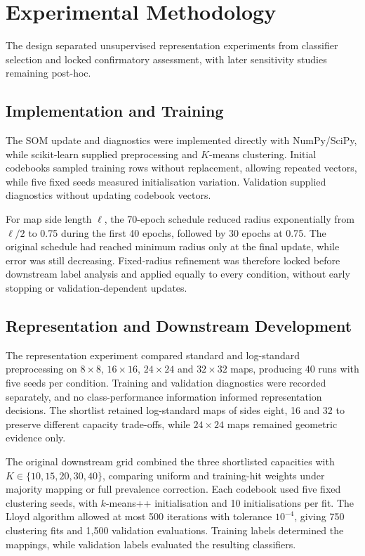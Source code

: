 \section{Experimental Methodology}

The design separated unsupervised representation experiments from classifier selection and locked confirmatory assessment, with later sensitivity studies remaining post-hoc.

\subsection{Implementation and Training}

The SOM update and diagnostics were implemented directly with NumPy/SciPy, while scikit-learn supplied preprocessing and $K$-means clustering. Initial codebooks sampled training rows without replacement, allowing repeated vectors, while five fixed seeds measured initialisation variation. Validation supplied diagnostics without updating codebook vectors.

For map side length $\ell$, the 70-epoch schedule reduced radius exponentially from $\ell/2$ to 0.75 during the first 40 epochs, followed by 30 epochs at 0.75. The original schedule had reached minimum radius only at the final update, while error was still decreasing. Fixed-radius refinement was therefore locked before downstream label analysis and applied equally to every condition, without early stopping or validation-dependent updates.

\subsection{Representation and Downstream Development}

The representation experiment compared standard and log-standard preprocessing on $8\times8$, $16\times16$, $24\times24$ and $32\times32$ maps, producing 40 runs with five seeds per condition. Training and validation diagnostics were recorded separately, and no class-performance information informed representation decisions. The shortlist retained log-standard maps of sides eight, 16 and 32 to preserve different capacity trade-offs, while $24\times24$ maps remained geometric evidence only.

The original downstream grid combined the three shortlisted capacities with $K\in\{10,15,20,30,40\}$, comparing uniform and training-hit weights under majority mapping or full prevalence correction. Each codebook used five fixed clustering seeds, with $k$-means++ initialisation and 10 initialisations per fit. The Lloyd algorithm allowed at most 500 iterations with tolerance $10^{-4}$, giving 750 clustering fits and 1,500 validation evaluations. Training labels determined the mappings, while validation labels evaluated the resulting classifiers.

